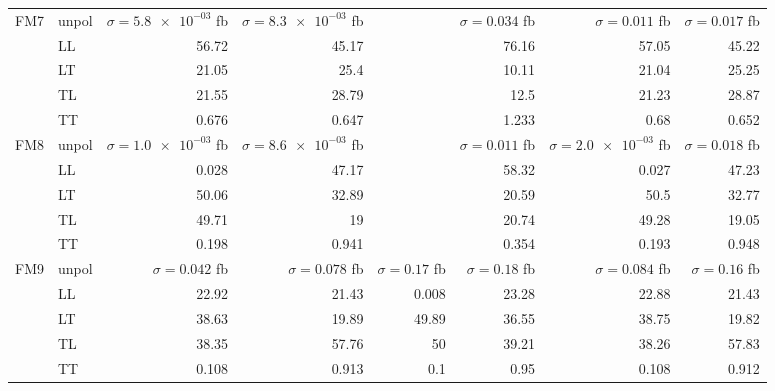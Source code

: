 \begin{table}[h]
{\begin{tabular}{llrrrrrr}
\midrule
\multirow{5}{*}{FM7}
 & unpol & $\sigma = \num{5.8e-03}$ fb & $\sigma = \num{8.3e-03}$ fb &  & $\sigma = \num{0.034}$ fb & $\sigma = \num{0.011}$ fb & $\sigma = \num{0.017}$ fb \\
 & LL & \num{56.72} & \num{45.17} &  & \num{76.16} & \num{57.05} & \num{45.22} \\
 & LT & \num{21.05} & \num{25.4} &  & \num{10.11} & \num{21.04} & \num{25.25} \\
 & TL & \num{21.55} & \num{28.79} &  & \num{12.5} & \num{21.23} & \num{28.87} \\
 & TT & \num{0.676} & \num{0.647} &  & \num{1.233} & \num{0.68} & \num{0.652} \\
\midrule
\multirow{5}{*}{FM8}
 & unpol & $\sigma = \num{1.0e-03}$ fb & $\sigma = \num{8.6e-03}$ fb &  & $\sigma = \num{0.011}$ fb & $\sigma = \num{2.0e-03}$ fb & $\sigma = \num{0.018}$ fb \\
 & LL & \num{0.028} & \num{47.17} &  & \num{58.32} & \num{0.027} & \num{47.23} \\
 & LT & \num{50.06} & \num{32.89} &  & \num{20.59} & \num{50.5} & \num{32.77} \\
 & TL & \num{49.71} & \num{19} &  & \num{20.74} & \num{49.28} & \num{19.05} \\
 & TT & \num{0.198} & \num{0.941} &  & \num{0.354} & \num{0.193} & \num{0.948} \\
\midrule
\multirow{5}{*}{FM9}
 & unpol & $\sigma = \num{0.042}$ fb & $\sigma = \num{0.078}$ fb & $\sigma = \num{0.17}$ fb & $\sigma = \num{0.18}$ fb & $\sigma = \num{0.084}$ fb & $\sigma = \num{0.16}$ fb \\
 & LL & \num{22.92} & \num{21.43} & \num{0.008} & \num{23.28} & \num{22.88} & \num{21.43} \\
 & LT & \num{38.63} & \num{19.89} & \num{49.89} & \num{36.55} & \num{38.75} & \num{19.82} \\
 & TL & \num{38.35} & \num{57.76} & \num{50} & \num{39.21} & \num{38.26} & \num{57.83} \\
 & TT & \num{0.108} & \num{0.913} & \num{0.1} & \num{0.95} & \num{0.108} & \num{0.912} \\
\bottomrule
\end{tabular}
}%
\end{table}
\newpage
